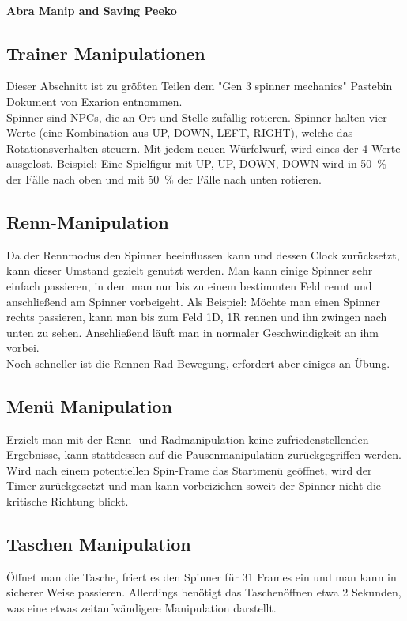 \documentclass[11pt,a4paper,titlepage]{article}
\begin{document}
\paragraph{Abra Manip and Saving Peeko}


\begin{appendix}
\section{Trainer Manipulationen}
Dieser Abschnitt ist zu größten Teilen dem "Gen 3 spinner mechanics" Pastebin Dokument von Exarion entnommen.\\
Spinner sind NPCs, die an Ort und Stelle zufällig rotieren. Spinner halten vier Werte (eine Kombination aus UP, DOWN, LEFT, RIGHT), welche das Rotationsverhalten steuern. Mit jedem neuen Würfelwurf, wird eines der 4 Werte ausgelost. Beispiel: Eine Spielfigur mit UP, UP, DOWN, DOWN wird in \SI{50}{\percent} der Fälle nach oben und mit \SI{50}{\percent} der Fälle nach unten rotieren.
\subsection{Renn-Manipulation}
Da der Rennmodus den Spinner beeinflussen kann und dessen Clock zurücksetzt, kann dieser Umstand gezielt genutzt werden. Man kann einige Spinner sehr einfach passieren, in dem man nur bis zu einem bestimmten Feld rennt und anschließend am Spinner vorbeigeht. Als Beispiel: Möchte man einen Spinner rechts passieren, kann man bis zum Feld 1D, 1R rennen und ihn zwingen nach unten zu sehen. Anschließend läuft man in normaler Geschwindigkeit an ihm vorbei.\\
Noch schneller ist die Rennen-Rad-Bewegung, erfordert aber einiges an Übung.
\subsection{Menü Manipulation}
Erzielt man mit der Renn- und Radmanipulation keine zufriedenstellenden Ergebnisse, kann stattdessen auf die Pausenmanipulation zurückgegriffen werden.\\
Wird nach einem potentiellen Spin-Frame das Startmenü geöffnet, wird der Timer zurückgesetzt und man kann vorbeiziehen soweit der Spinner nicht die kritische Richtung blickt.
\subsection{Taschen Manipulation}
Öffnet man die Tasche, friert es den Spinner für 31 Frames ein und man kann in sicherer Weise passieren. Allerdings benötigt das Taschenöffnen etwa 2 Sekunden, was eine etwas zeitaufwändigere Manipulation darstellt.
\end{appendix}
\end{document}
